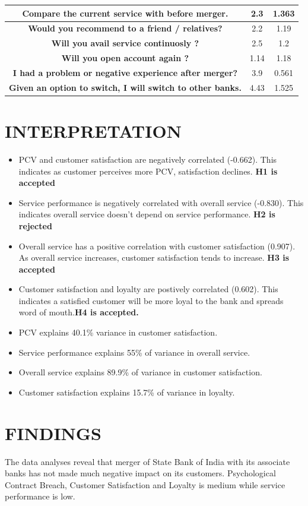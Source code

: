 \documentclass[a4paper, 14pt]{article}
\begin{document}
{\begin{table}[H]
\begin{tabular}{|c|c|c|}
\hline
\textbf{ Compare the current service with before merger.} & 2.3 & 1.363 \\
\hline
\textbf{ Would you recommend to a friend / relatives?} & 2.2 & 1.19 \\
\hline
\textbf{ Will you avail service continuosly ?} & 2.5 & 1.2 \\
\hline
\textbf{ Will you open account again ?} & 1.14 & 1.18 \\
\hline
\textbf{ I had a problem or negative experience after merger?} & 3.9 & 0.561 \\
\hline
\textbf{ Given an option to switch, I will switch to other banks.} & 4.43 & 1.525 \\
\hline
\end{tabular}
\end{table}



\section*{INTERPRETATION}
\begin{itemize}
\item PCV and customer satisfaction are negatively correlated (-0.662). This indicates as customer perceives more PCV, satisfaction declines. \textbf{H1 is accepted}
\item Service performance is negatively correlated with overall service (-0.830). This indicates overall service doesn't depend on service performance. \textbf{H2 is rejected}
\item Overall service has a positive correlation with customer satisfaction (0.907). As overall service increases, customer satisfaction tends to increase. 
\textbf{H3 is accepted}
\item Customer satisfaction and loyalty are postively correlated (0.602). This indicates a satisfied customer will be more loyal to the bank and spreads word of mouth.\textbf{H4 is accepted.}
\item PCV explains 40.1\% variance in customer satisfaction.
\item Service performance explains 55\% of variance in overall service.
\item Overall service explains 89.9\% of variance in customer satisfaction.
\item Customer satisfaction explains 15.7\% of variance in loyalty.
\end{itemize}
\section*{FINDINGS}
The data analyses reveal that merger of State Bank of India with its associate banks has not made much negative impact on its customers. Psychological Contract Breach, Customer Satisfaction and Loyalty is medium while service performance is low.

}
\end{document}

